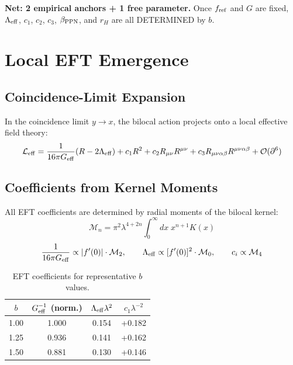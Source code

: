 \documentclass[12pt]{article}
\begin{document}
\textbf{Net: 2 empirical anchors + 1 free parameter.} Once $f_{\rm ref}$ and $G$ are fixed, $\Lambda_{\rm eff}$, $c_1$, $c_2$, $c_3$, $\beta_{\rm PPN}$, and $r_H$ are all DETERMINED by $b$.

\section{Local EFT Emergence}
\label{sec:EFT}

\subsection{Coincidence-Limit Expansion}

In the coincidence limit $y\to x$, the bilocal action projects onto a local effective field theory:
\begin{equation}
\mathcal{L}_{\rm eff} = \frac{1}{16\pi G_{\rm eff}}(R - 2\Lambda_{\rm eff})
+ c_1 R^2 + c_2 R_{\mu\nu}R^{\mu\nu}
+ c_3 R_{\mu\nu\alpha\beta}R^{\mu\nu\alpha\beta}
+ \mathcal{O}(\partial^6)
\label{eq:Leff}
\end{equation}

\subsection{Coefficients from Kernel Moments}

All EFT coefficients are determined by radial moments of the bilocal kernel:
\begin{equation}
\mathcal{M}_n = \pi^2\lambda^{4+2n}\int_0^\infty dx\; x^{n+1} K(x)
\end{equation}
\begin{equation}
\frac{1}{16\pi G_{\rm eff}} \propto |f'(0)|\cdot\mathcal{M}_2,\qquad
\Lambda_{\rm eff} \propto [f'(0)]^2\cdot\mathcal{M}_0,\qquad
c_i \propto \mathcal{M}_4
\end{equation}

\begin{table}[h]
\centering
\begin{tabular}{c|c|c|c}
$b$ & $G_{\rm eff}^{-1}$ (norm.) & $\Lambda_{\rm eff}\lambda^2$ & $c_1\lambda^{-2}$ \\
\midrule
1.00 & 1.000 & 0.154 & +0.182 \\
1.25 & 0.936 & 0.141 & +0.162 \\
1.50 & 0.881 & 0.130 & +0.146 \\
\end{tabular}
\caption{EFT coefficients for representative $b$ values.}
\label{tab:EFTcoeffs}
\end{table}
\end{document}
